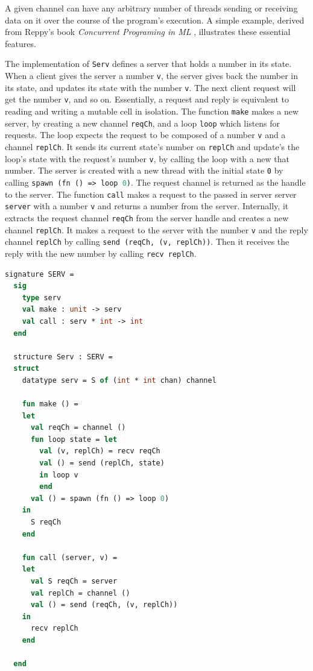 \documentclass[10pt]{article}
\begin{document}
A given channel can have any arbitrary number of threads sending or receiving data on it over
the course of the program's execution. A simple example, derived from Reppy's book
\textit{Concurrent Programing in ML} \cite{concurrent_ml}, illustrates these essential
features.

The implementation of \lstinline{Serv} defines a server that holds a number in its state.
When a client gives the server a number \lstinline{v}, the server gives back the number in
its state, and updates its state with the number \lstinline{v}.  The next client request will
get the number \lstinline{v}, and so on. Essentially, a request and reply is equivalent
to reading and writing a mutable cell in isolation. The function \lstinline{make} makes a new
server, by creating a new channel \lstinline{reqCh}, and a loop \lstinline{loop} which listens
for requests. The loop expects the request to be composed of a number \lstinline{v} and a
channel \lstinline{replCh}. It sends its current state's number on \lstinline{replCh} and
update's the loop's state with the request's number \lstinline{v}, by calling the loop with a
new that number. The server is created with a new thread with the initial state \lstinline{0}
by calling \lstinline[language=ML]{spawn (fn () => loop 0)}. The request channel is returned
as the handle to the server.  The function \lstinline{call} makes a request to the passed in
server server \lstinline{server} with a number \lstinline{v} and returns a number from the
server. Internally, it extracts the request channel \lstinline{reqCh} from the
server handle and creates a new channel \lstinline{replCh}. It makes a request to the server
with the number \lstinline{v} and the reply channel \lstinline{replCh} by calling
\lstinline{send (reqCh, (v, replCh))}. Then it receives the reply with the new number by
calling \lstinline{recv replCh}.


\begin{lstlisting}[language=ML, mathescape]
  signature SERV =
  sig 
    type serv
    val make : unit -> serv
    val call : serv * int -> int
  end

  structure Serv : SERV =
  struct 
    datatype serv = S of (int * int chan) channel 

    fun make () =
    let 
      val reqCh = channel ()
      fun loop state = let
        val (v, replCh) = recv reqCh
        val () = send (replCh, state)
        in loop v
        end
      val () = spawn (fn () => loop 0)
    in
      S reqCh
    end 

    fun call (server, v) =
    let 
      val S reqCh = server
      val replCh = channel () 
      val () = send (reqCh, (v, replCh))
    in
      recv replCh
    end

  end
\end{lstlisting}
\end{document}
